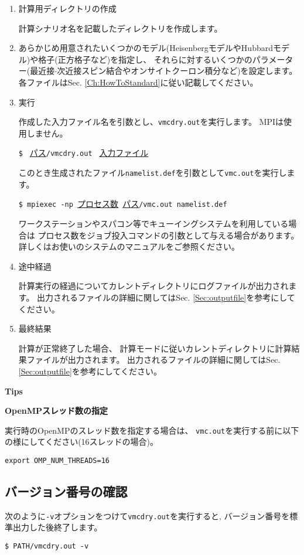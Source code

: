  \begin{enumerate}
   \item  計算用ディレクトリの作成

計算シナリオ名を記載したディレクトリを作成します。

   \item  {}

あらかじめ用意されたいくつかのモデル(HeisenbergモデルやHubbardモデル)や格子(正方格子など)を指定し、
それらに対するいくつかのパラメーター(最近接$\cdot$次近接スピン結合やオンサイトクーロン積分など)を設定します。
各ファイルはSec. \ref{Ch:HowToStandard}に従い記載してください。

 \item  実行

作成した入力ファイル名を引数とし、\verb|vmcdry.out|を実行します。
MPIは使用しません。

\verb|$ | \underline{パス}\verb|/vmcdry.out | \underline{入力ファイル} 

このとき生成されたファイル\verb|namelist.def|を引数として\verb|vmc.out|を実行します。

\verb|$ mpiexec -np |\underline{プロセス数}\verb| |\underline{パス}\verb|/vmc.out namelist.def|

ワークステーションやスパコン等でキューイングシステムを利用している場合は
プロセス数をジョブ投入コマンドの引数として与える場合があります。
詳しくはお使いのシステムのマニュアルをご参照ください。

\item 途中経過

計算実行の経過についてカレントディレクトリにログファイルが出力されます。
出力されるファイルの詳細に関してはSec. \ref{Sec:outputfile}を参考にしてください。

\item 最終結果

計算が正常終了した場合、
計算モードに従いカレントディレクトリに計算結果ファイルが出力されます。
出力されるファイルの詳細に関してはSec. \ref{Sec:outputfile}を参考にしてください。
\end{enumerate}

\begin{screen}
\Large 
{\bf Tips}
\normalsize

{\bf OpenMPスレッド数の指定}

実行時のOpenMPのスレッド数を指定する場合は、
\verb|vmc.out|を実行する前に以下の様にしてください(16スレッドの場合)。
\begin{verbatim}
export OMP_NUM_THREADS=16
\end{verbatim}

\end{screen}

\subsection{バージョン番号の確認}

次のように\verb|-v|オプションをつけて\verb|vmcdry.out|を実行すると, 
バージョン番号を標準出力した後終了します。

\begin{verbatim}
$ PATH/vmcdry.out -v
\end{verbatim}


